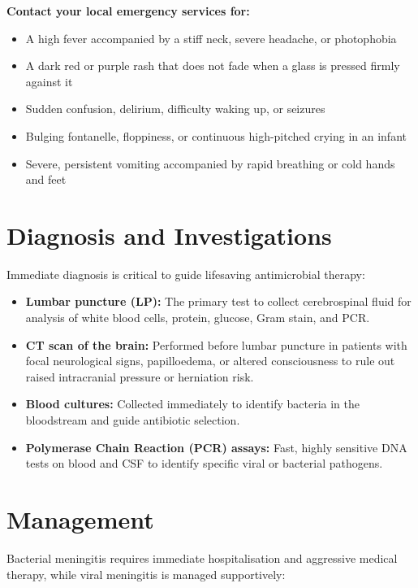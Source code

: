 \textbf{Contact your local emergency services for:}
\begin{itemize}
    \item A high fever accompanied by a stiff neck, severe headache, or photophobia
    \item A dark red or purple rash that does not fade when a glass is pressed firmly against it
    \item Sudden confusion, delirium, difficulty waking up, or seizures
    \item Bulging fontanelle, floppiness, or continuous high-pitched crying in an infant
    \item Severe, persistent vomiting accompanied by rapid breathing or cold hands and feet
\end{itemize}

\section*{Diagnosis and Investigations}
Immediate diagnosis is critical to guide lifesaving antimicrobial therapy:

\begin{itemize}
    \item \textbf{Lumbar puncture (LP):} The primary test to collect cerebrospinal fluid for analysis of white blood cells, protein, glucose, Gram stain, and PCR.
    \item \textbf{CT scan of the brain:} Performed before lumbar puncture in patients with focal neurological signs, papilloedema, or altered consciousness to rule out raised intracranial pressure or herniation risk.
    \item \textbf{Blood cultures:} Collected immediately to identify bacteria in the bloodstream and guide antibiotic selection.
    \item \textbf{Polymerase Chain Reaction (PCR) assays:} Fast, highly sensitive DNA tests on blood and CSF to identify specific viral or bacterial pathogens.
\end{itemize}

\section*{Management}
Bacterial meningitis requires immediate hospitalisation and aggressive medical therapy, while viral meningitis is managed supportively:

